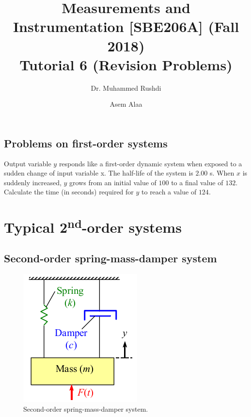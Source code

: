 \documentclass[a4paper,11pt,dvipsnames]{book}
\begin{document}
\author{Dr. Muhammed Rushdi \and Asem Alaa}

\title{Measurements and Instrumentation [SBE206A] (Fall 2018)\\ Tutorial 6 (Revision Problems)}

\maketitle


\section*{Problems on first-order systems}


\begin{question}

Output variable $y$ responds like a first-order dynamic system when exposed to a sudden change of input variable x. The half-life of the system is $2.00$ s. When $x$ is suddenly
increased, $y$ grows from an initial value of $100$ to a final value of $132$.
Calculate the time (in seconds) required for $y$ to reach a value of $124$.
\examspace*{10em}

\end{question}
\begin{solution}


\end{solution}

\chapter*{Typical 2\textsuperscript{nd}-order systems}


\section*{Second-order spring-mass-damper system}


\begin{figure}[h!]\label{fig:damper}
\centering
  \includegraphics[width=0.3\linewidth]{damper}
  \caption{Second-order spring-mass-damper system.} 
\end{figure}
\end{document}
